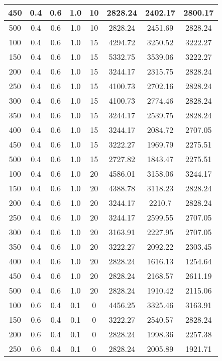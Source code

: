 \documentclass[a4paper, 12pt]{extreport}
\begin{document}
\begin{itemize}
\begin{longtable}{|c|c|c|c|c|c|c|c|}
			450 & 0.4 & 0.6 & 1.0 & 10 & 2828.24 & 2402.17 & 2800.17 \\\hline
			500 & 0.4 & 0.6 & 1.0 & 10 & 2828.24 & 2451.69 & 2828.24 \\\hline
			100 & 0.4 & 0.6 & 1.0 & 15 & 4294.72 & 3250.52 & 3222.27 \\\hline
			150 & 0.4 & 0.6 & 1.0 & 15 & 5332.75 & 3539.06 & 3222.27 \\\hline
			200 & 0.4 & 0.6 & 1.0 & 15 & 3244.17 & 2315.75 & 2828.24 \\\hline
			250 & 0.4 & 0.6 & 1.0 & 15 & 4100.73 & 2702.16 & 2828.24 \\\hline
			300 & 0.4 & 0.6 & 1.0 & 15 & 4100.73 & 2774.46 & 2828.24 \\\hline
			350 & 0.4 & 0.6 & 1.0 & 15 & 3244.17 & 2539.75 & 2828.24 \\\hline
			400 & 0.4 & 0.6 & 1.0 & 15 & 3244.17 & 2084.72 & 2707.05 \\\hline
			450 & 0.4 & 0.6 & 1.0 & 15 & 3222.27 & 1969.79 & 2275.51 \\\hline
			500 & 0.4 & 0.6 & 1.0 & 15 & 2727.82 & 1843.47 & 2275.51 \\\hline
			100 & 0.4 & 0.6 & 1.0 & 20 & 4586.01 & 3158.06 & 3244.17 \\\hline
			150 & 0.4 & 0.6 & 1.0 & 20 & 4388.78 & 3118.23 & 2828.24 \\\hline
			200 & 0.4 & 0.6 & 1.0 & 20 & 3244.17 & 2210.7 & 2828.24 \\\hline
			250 & 0.4 & 0.6 & 1.0 & 20 & 3244.17 & 2599.55 & 2707.05 \\\hline
			300 & 0.4 & 0.6 & 1.0 & 20 & 3163.91 & 2227.95 & 2707.05 \\\hline
			350 & 0.4 & 0.6 & 1.0 & 20 & 3222.27 & 2092.22 & 2303.45 \\\hline
			400 & 0.4 & 0.6 & 1.0 & 20 & 2828.24 & 1616.13 & 1254.64 \\\hline
			450 & 0.4 & 0.6 & 1.0 & 20 & 2828.24 & 2168.57 & 2611.19 \\\hline
			500 & 0.4 & 0.6 & 1.0 & 20 & 2828.24 & 1910.42 & 2115.06 \\\hline
			100 & 0.6 & 0.4 & 0.1 & 0 & 4456.25 & 3325.46 & 3163.91 \\\hline
			150 & 0.6 & 0.4 & 0.1 & 0 & 3222.27 & 2540.57 & 2828.24 \\\hline
			200 & 0.6 & 0.4 & 0.1 & 0 & 2828.24 & 1998.36 & 2257.38 \\\hline
			250 & 0.6 & 0.4 & 0.1 & 0 & 2828.24 & 2005.89 & 1921.71 \\\hline

\end{longtable}
\end{itemize}
\end{document}
